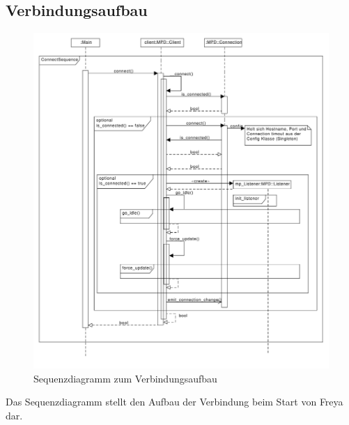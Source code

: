 \subsection{Verbindungsaufbau}
\begin{figure}[htb!]
	\centering
        \includegraphics[scale=0.5]{ConnectSequence.pdf}
	\caption{Sequenzdiagramm zum Verbindungsaufbau}
	\label{seq_client_connect}
\end{figure}
Das Sequenzdiagramm stellt den Aufbau der Verbindung beim Start von Freya dar.
\\




